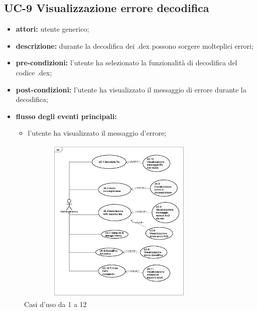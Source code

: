 \subsection*{UC-9 Visualizzazione errore decodifica}\label{subsec:uc-9-visualizzazione-errore-decodifica}
\begin{itemize}
    \item \textbf{attori:} utente generico;
    \item \textbf{descrizione:} durante la decodifica dei .dex possono sorgere molteplici errori;
    \item \textbf{pre-condizioni:} l'utente ha selezionato la funzionalità di decodifica del codice .dex;
    \item \textbf{post-condizioni:} l'utente ha visualizzato il messaggio di errore durante la decodifica;
    \item \textbf{flusso degli eventi principali:}
    \begin{itemize}
        \item l'utente ha visualizzato il messaggio d'errore;
    \end{itemize}
\end{itemize}

\begin{figure}[H]
    \centering
    \includegraphics[width=10cm, height=8cm]{./immagini/usecase/uc_principali.png}
    \caption{Casi d'uso da 1 a 12}
\end{figure}

